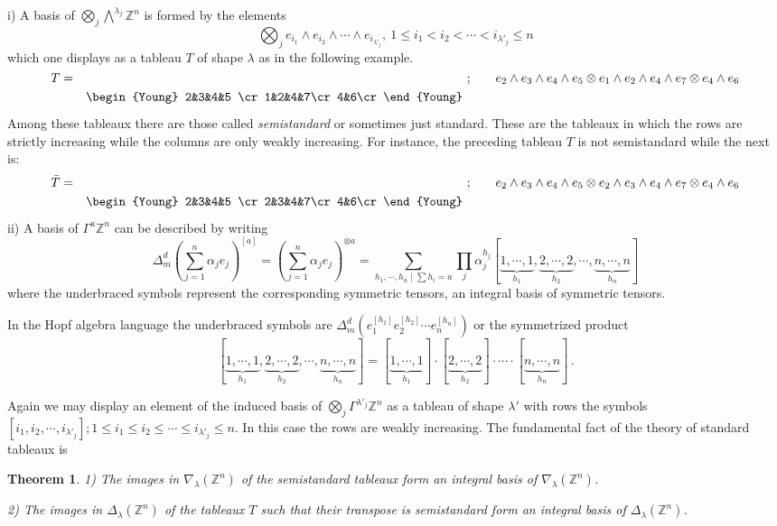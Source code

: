 \documentclass[10pt]{amsart}
\newtheorem{theorem}{Theorem}[section]
\theoremstyle{definition}
\theoremstyle{remark}
\newcommand{\Z}{\mathbb Z}
\begin{document}
 i)\quad {\bf the module $\nabla_\lambda(\Z^n)$} \quad A basis  of  $\bigotimes_j\bigwedge^{\lambda_j}\Z^n$  is formed by the elements   $$\bigotimes_je_{i_1}\wedge e_{i_2} \wedge\cdots \wedge e_{i_{\lambda'_j}},\ 1\leq i_1 <{i_2} <\cdots <{i_{\lambda'_j}}\leq n$$  which one displays as a  tableau $T$  of  shape $\lambda$ as in the following example.
$$\raisebox{ 15pt}{$T=$}\quad\begin{Young}
2&3&4&5 \cr
1&2&4&7\cr
4&6\cr \end{Young} \raisebox{ 15pt}{ ;}\qquad \raisebox{ 15pt}{$e_2\wedge e_3\wedge e_4\wedge e_5\otimes e_1\wedge e_2\wedge e_4\wedge e_7\otimes e_4\wedge e_6$}$$
Among these tableaux there are those called {\em semistandard} or sometimes just  standard. These are the tableaux in which the rows are strictly increasing while the columns are only weakly increasing. For instance, the preceding tableau $T$ is not semistandard while the next is:
$$\raisebox{ 15pt}{$\bar T=$}\quad\begin{Young}
2&3&4&5 \cr
2&3&4&7\cr 4&6\cr \end{Young} \raisebox{ 15pt}{ ;}\qquad \raisebox{ 15pt}{$e_2\wedge e_3\wedge e_4\wedge e_5\otimes e_2\wedge e_3\wedge e_4\wedge e_7\otimes e_4\wedge e_6$}$$
ii)\quad {\bf the module $\Delta_\lambda(\Z^n)$} \quad   A basis  of  $\Gamma^a\Z^n$  can be described by writing
\begin{equation}\label{lepp}
\Delta^d_m(\sum_{j=1}^n\alpha_je_j)^{[ a]}=(\sum_{j=1}^n\alpha_je_j)^{\otimes a}=\sum_{h_1,\cdots,h_n\mid\sum h_i=a}\prod_j\alpha_j^{h_j}[\underbrace{1,\cdots,1}_{h_1},\underbrace{2,\cdots,2}_{h_2},\cdots, \underbrace{n,\cdots,n}_{h_n}]
\end{equation}
where the underbraced symbols represent the corresponding symmetric tensors, an integral basis of  symmetric tensors.

In the Hopf algebra language  the    underbraced symbols  are $\Delta^d_m(e_1^{[h_1]} e_2^{[h_2]} \cdots e_n^{[h_n]} )$ or the symmetrized product $$[\underbrace{1,\cdots,1}_{h_1},\underbrace{2,\cdots,2}_{h_2},\cdots, \underbrace{n,\cdots,n}_{h_n}]=[\underbrace{1,\cdots,1}_{h_1}]\cdot[\underbrace{2,\cdots,2}_{h_2}]\cdot \cdots \cdot[ \underbrace{n,\cdots,n}_{h_n} ]\,.$$\medskip



Again we may display an element of the induced basis of  $\bigotimes_j\Gamma^{\lambda'_j}\Z^n$  as a tableau of shape  $\lambda'$  with rows  the symbols $[ i_1 ,{i_2} ,\cdots ,{i_{\lambda'_j}} ];1\leq i_1 \leq {i_2} \leq \cdots \leq {i_{\lambda'_j}}\leq n$.
 In this case the rows are weakly increasing.
The fundamental fact of the theory of standard tableaux is
\begin{theorem}\label{stat}
1) The images in  $\nabla_\lambda(\Z^n)$ of the semistandard  tableaux  form an integral basis of $\nabla_\lambda(\Z^n)$.

2) The images in  $\Delta_\lambda(\Z^n)$ of the   tableaux $T$  such  that their transpose is semistandard form an integral basis of $\Delta_\lambda(\Z^n)$.
\end{theorem}
\end{document}
